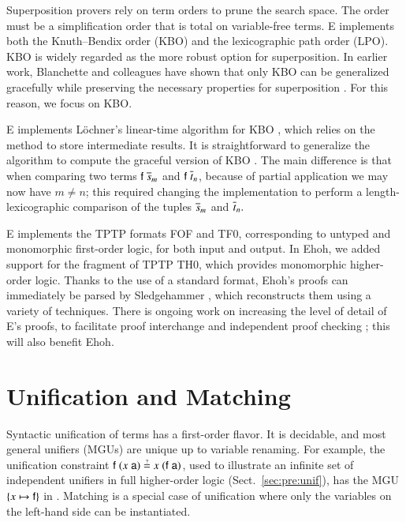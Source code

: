  Superposition provers rely on term orders to prune the search
space. The order must be a simplification order that
is total on variable-free
terms. E implements both the Knuth--Bendix order (KBO) and the lexicographic path order
(LPO). KBO is widely regarded as the more
robust option for superposition.
%
In earlier work, Blanchette and colleagues have shown that only KBO can be
generalized gracefully while preserving the necessary properties for
superposition \cite{bbww-17-kbo,bww-17-rpo}. For this
reason, we focus on KBO.

E implements L\"ochner's linear-time algorithm for KBO
\cite{bl-06-kbo}, which relies on the  method to store
intermediate results. %
It is straightforward to generalize the algorithm to compute the
graceful \lfhol{} version of KBO \cite{bbww-17-kbo}.
The main difference is that when comparing two terms $\mathsf{f} \; \overline{s}_{m}$
and $\mathsf{f} \; \overline{t}_{n}$, because of partial application we may now
have $m \not= n$; this required changing the implementation to
perform a length-lexicographic comparison of the tuples $\overline{s}_{m}$ and
$\overline{t}_{n}.$

E implements the TPTP \cite{gs-17-tptp} formats FOF and TF0, corresponding to
untyped and mono\-morphic first-order logic, for both input and output. In
Ehoh, we added support for the \lfhol{} fragment of TPTP TH0, which provides
mono\-morphic higher-order logic. Thanks to the use of a standard format,
Ehoh's proofs can immediately be parsed by Sledgehammer
\cite{pb-12-sh}, which reconstructs them using a variety of
techniques.
There is ongoing work on increasing the level of detail of E's proofs, to
facilitate proof interchange and independent proof checking
\cite{rs-17-checkable};
this will also benefit Ehoh.

\section{Unification and Matching}
\label{sec:ehoh:unif-match}

Syntactic unification of \lfhol{} terms has a first-order flavor.
It is decidable, and most general unifiers (MGUs) are unique up to variable
renaming. For example, the unification constraint $\cst{f} \; (x \;
\cst{a}) \unif x \; (\cst{f} \; \cst{a})$, used to illustrate an infinite set of 
independent unifiers in full higher-order logic (Sect.~\ref{sec:pre:unif}), has the MGU 
$\{x \mapsto \mathsf{f}\}$ in \lfhol{}.
Matching is a special case of unification
where only the variables on the left-hand side can be instantiated.

